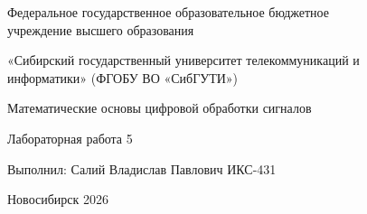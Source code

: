 
\thispagestyle{empty}

\begin{center}
    Федеральное государственное образовательное бюджетное \\ учреждение высшего образования

    \vspace{12pt}

    «Сибирский государственный университет телекоммуникаций и \\ информатики» (ФГОБУ ВО «СибГУТИ»)
\end{center}

\vfill

\begin{center}
    Математические основы цифровой обработки сигналов

    \vspace{24pt}

    Лабораторная работа 5
\end{center}

\vfill

\begin{center}
    Выполнил: Салий Владислав Павлович ИКС-431
\end{center}

\vfill

\begin{center}
    Новосибирск 2026
\end{center}

\endinput
